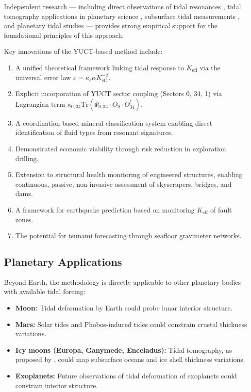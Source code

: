 \documentclass[12pt,a4paper]{article}
\theoremstyle{remark}
\newcommand{\Keff}{K_{\mathrm{eff}}}
\newcommand{\kappac}{\kappa_c}
\newcommand{\eps}{\varepsilon}
\begin{document}
	Independent research — including direct observations of tidal resonances \cite{Sibgatulin2014}, tidal tomography applications in planetary science \cite{RoviraNavarro2025}, subsurface tidal measurements \cite{Rogister2024}, and planetary tidal studies \cite{Briaud2025} — provides strong empirical support for the foundational principles of this approach.
	
	Key innovations of the YUCT-based method include:
	
	\begin{enumerate}
		\item A unified theoretical framework linking tidal response to $\Keff$ via the universal error law $\eps = \kappac \alpha \Keff^{-\beta}$.
		\item Explicit incorporation of YUCT sector coupling (Sectors 0, 34, 1) via Lagrangian term $\kappa_{0,34} \mathrm{Tr}(\Psi_{0,34} \cdot O_0 \cdot O_{34}^\dagger)$.
		\item A coordination-based mineral classification system enabling direct identification of fluid types from resonant signatures.
		\item Demonstrated economic viability through risk reduction in exploration drilling.
		\item Extension to structural health monitoring of engineered structures, enabling continuous, passive, non-invasive assessment of skyscrapers, bridges, and dams.
		\item A framework for earthquake prediction based on monitoring \(K_{\mathrm{eff}}\) of fault zones.
		\item The potential for tsunami forecasting through seafloor gravimeter networks.
	\end{enumerate}
	
	\subsection{Planetary Applications}
	
	Beyond Earth, the methodology is directly applicable to other planetary bodies with available tidal forcing:
	
	\begin{itemize}
		\item \textbf{Moon:} Tidal deformation by Earth could probe lunar interior structure.
		\item \textbf{Mars:} Solar tides and Phobos-induced tides could constrain crustal thickness variations.
		\item \textbf{Icy moons (Europa, Ganymede, Enceladus):} Tidal tomography, as proposed by \cite{RoviraNavarro2025}, could map subsurface oceans and ice shell thickness variations.
		\item \textbf{Exoplanets:} Future observations of tidal deformation of exoplanets could constrain interior structure.
	\end{itemize}
	
\end{document}
